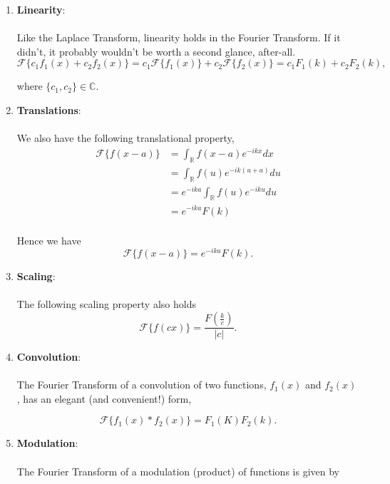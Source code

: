 \begin{enumerate}

\item {\bf{Linearity}}: \\ \\

Like the Laplace Transform, linearity holds in the Fourier Transform. If it didn't, it probably wouldn't be worth a second glance, after-all.
$$\mathscr{F}\{ c_1 f_1(x) + c_2 f_2(x) \} = c_1 \mathscr{F}\{f_1(x)\} + c_2\mathscr{F}\{f_2(x) \} = c_1F_1(k) + c_2F_2(k),$$

where $\{c_1,c_2\}\in\mathbb{C}.$ 

\item {\bf{Translations}}: \\ \\

We also have the following translational property,
\begin{align*}
\mathscr{F}\{ f(x-a)\} &= \int_{\mathbb{R}} f(x-a) e^{-ikx} dx \\
&= \int_{\mathbb{R}} f(u) e^{-ik(u+a)} du \\
&= e^{-ika} \int_{\mathbb{R}} f(u) e^{-iku} du \\
&= e^{-ika} F(k)\\
\end{align*}

Hence we have $$\mathscr{F}\{ f(x-a)\} =e^{-ika} F(k).$$

\item {\bf{Scaling}}: \\ \\
The following scaling property also holds
$$\mathscr{F}\{ f(cx) \} = \frac{ F\left( \frac{k}{c} \right)}{|c|}.$$

\item {\bf{Convolution}}: \\ \\ 

The Fourier Transform of a convolution of two functions, $f_1(x)$ and $f_2(x)$, has an elegant (and convenient!) form,

$$\mathscr{F}\{ f_1(x)\ast f_2(x) \} = F_1(K) F_2(k).$$

\item {\bf{Modulation}}: \\ \\

The Fourier Transform of a modulation (product) of functions is given by


\end{enumerate}
